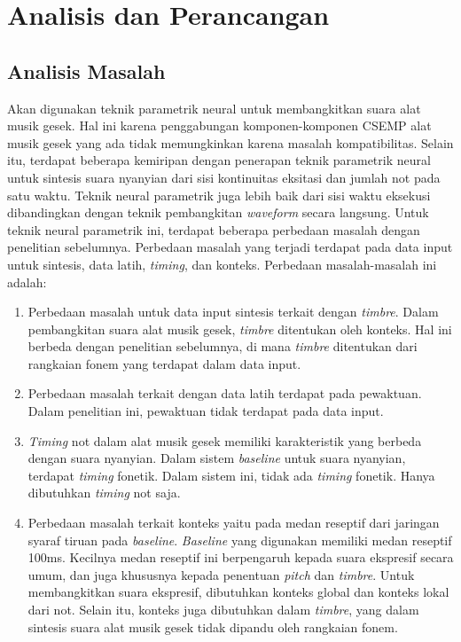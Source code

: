\chapter{Analisis dan Perancangan}

\section{Analisis Masalah}\label{section-problem-analysis}

Akan digunakan teknik parametrik neural untuk membangkitkan suara alat musik gesek. Hal ini karena penggabungan komponen-komponen CSEMP alat musik gesek yang ada tidak memungkinkan karena masalah kompatibilitas. Selain itu, terdapat beberapa kemiripan dengan penerapan teknik parametrik neural untuk sintesis suara nyanyian dari sisi kontinuitas eksitasi dan jumlah not pada satu waktu. Teknik neural parametrik juga lebih baik dari sisi waktu eksekusi dibandingkan dengan teknik pembangkitan \textit{waveform} secara langsung. Untuk teknik neural parametrik ini, terdapat beberapa perbedaan masalah dengan penelitian sebelumnya\parencite{bonada2017singing}. Perbedaan masalah yang terjadi terdapat pada data input untuk sintesis, data latih, \textit{timing}, dan konteks. Perbedaan masalah-masalah ini adalah:

\begin{enumerate}

\item Perbedaan masalah untuk data input sintesis terkait dengan \textit{timbre}. Dalam pembangkitan suara alat musik gesek, \textit{timbre} ditentukan oleh konteks. Hal ini berbeda dengan penelitian sebelumnya, di mana \textit{timbre} ditentukan dari rangkaian fonem yang terdapat dalam data input.

\item Perbedaan masalah terkait dengan data latih terdapat pada pewaktuan. Dalam penelitian ini, pewaktuan tidak terdapat pada data input.

\item \textit{Timing} not dalam alat musik gesek memiliki karakteristik yang berbeda dengan suara nyanyian. Dalam sistem \textit{baseline} untuk suara nyanyian, terdapat \textit{timing} fonetik. Dalam sistem ini, tidak ada \textit{timing} fonetik. Hanya dibutuhkan \textit{timing} not saja.

\item Perbedaan masalah terkait konteks yaitu pada medan reseptif dari jaringan syaraf tiruan pada \textit{baseline}. \textit{Baseline} yang digunakan memiliki medan reseptif 100ms. Kecilnya medan reseptif ini berpengaruh kepada suara ekspresif secara umum, dan juga khususnya kepada penentuan \textit{pitch} dan \textit{timbre}. Untuk membangkitkan suara ekspresif, dibutuhkan konteks global dan konteks lokal dari not. Selain itu, konteks juga dibutuhkan dalam \textit{timbre}, yang dalam sintesis suara alat musik gesek tidak dipandu oleh rangkaian fonem.

\end{enumerate}

